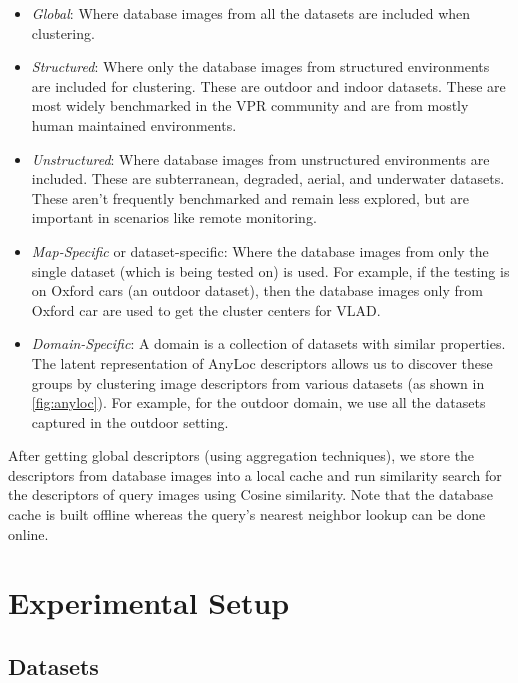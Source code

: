 \begin{itemize}
    \item \emph{Global}: Where database images from all the datasets
        are included when clustering.
    \item \emph{Structured}: Where only the database images from
        structured environments are included for clustering. These are
        outdoor and indoor datasets. These are most widely benchmarked
        in the VPR community and are from mostly human maintained
        environments.
    \item \emph{Unstructured}: Where database images from unstructured
        environments are included. These are subterranean, degraded,
        aerial, and underwater datasets. These aren't frequently
        benchmarked and remain less explored, but are important in
        scenarios like remote monitoring.
    \item \emph{Map-Specific} or dataset-specific: Where the database
        images from only the single dataset (which is being tested on)
        is used. For example, if the testing is on Oxford cars (an
        outdoor dataset), then the database images only from Oxford
        car are used to get the cluster centers for VLAD.
    \item \emph{Domain-Specific}: A domain is a collection of datasets
        with similar properties. The latent representation of AnyLoc
        descriptors allows us to discover these groups by clustering
        image descriptors from various datasets (as shown in
        \cref{fig:anyloc}). For example, for the outdoor domain, we
        use all the datasets captured in the outdoor setting.
\end{itemize}

After getting global descriptors (using aggregation techniques), we
store the descriptors from database images into a local cache and 
run similarity search for the descriptors of query images using Cosine
similarity. Note that the database cache is built offline whereas the
query's nearest neighbor lookup can be done online. 

\section{Experimental Setup}

\subsection{Datasets}

